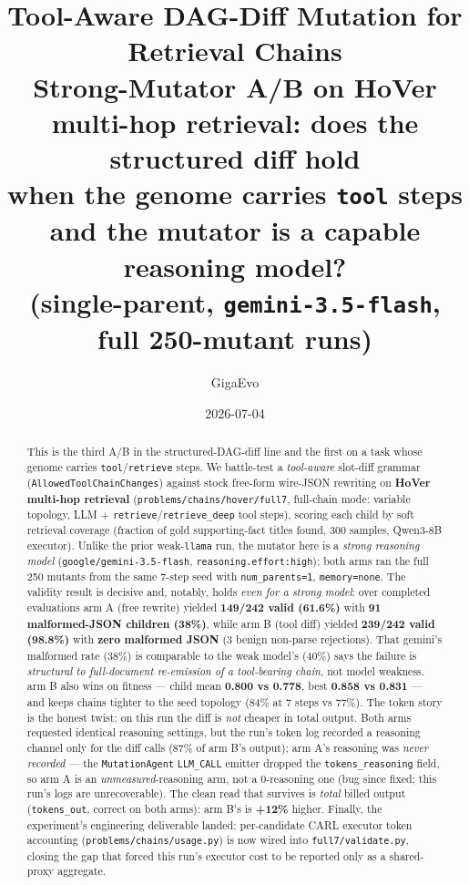 \documentclass[11pt]{article}
\title{\color{accent}\bfseries Tool-Aware DAG-Diff Mutation for Retrieval Chains\\
\large Strong-Mutator A/B on HoVer multi-hop retrieval: does the structured diff hold\\
when the genome carries \texttt{tool} steps and the mutator is a capable reasoning model?\\
\large (single-parent, \texttt{gemini-3.5-flash}, full 250-mutant runs)}
\author{GigaEvo}
\date{2026-07-04}
\newcommand{\armA}{\textcolor{bad}{arm A}}
\newcommand{\armB}{\textcolor{accent}{arm B}}
\begin{document}
\maketitle

\begin{abstract}
\noindent
This is the third A/B in the structured-DAG-diff line and the first on a task whose genome
carries \texttt{tool}/\texttt{retrieve} steps. We battle-test a \emph{tool-aware} slot-diff
grammar (\texttt{AllowedToolChainChanges}) against stock free-form wire-JSON rewriting on
\textbf{HoVer multi-hop retrieval} (\texttt{problems/chains/hover/full7}, full-chain mode:
variable topology, LLM + \texttt{retrieve}/\texttt{retrieve\_deep} tool steps), scoring each
child by soft retrieval coverage (fraction of gold supporting-fact titles found, 300 samples,
Qwen3-8B executor). Unlike the prior weak-\texttt{llama} run, the mutator here is a
\emph{strong reasoning model} (\texttt{google/gemini-3.5-flash}, \texttt{reasoning.effort:high});
both arms ran the full 250 mutants from the same 7-step seed with \texttt{num\_parents=1},
\texttt{memory=none}. The validity result is decisive and, notably, holds \emph{even for a
strong model}: over completed evaluations \armA{} (free rewrite) yielded \textbf{149/242 valid
(61.6\%)} with \textbf{91 malformed-JSON children (38\%)}, while \armB{} (tool diff) yielded
\textbf{239/242 valid (98.8\%)} with \textbf{zero malformed JSON} (3 benign non-parse
rejections). That gemini's malformed rate (38\%) is comparable to the weak model's (40\%) says
the failure is \emph{structural to full-document re-emission of a tool-bearing chain}, not
model weakness. \armB{} also wins on fitness --- child mean \textbf{0.800 vs 0.778}, best
\textbf{0.858 vs 0.831} --- and keeps chains tighter to the seed topology (84\% at 7 steps vs
77\%). The token story is the honest twist: on this run the diff is \emph{not} cheaper in total
output. Both arms requested identical reasoning settings, but the run's token log recorded a
reasoning channel only for the diff calls (87\% of \armB's output); \armA's reasoning was
\emph{never recorded} --- the \texttt{MutationAgent} \texttt{LLM\_CALL} emitter dropped the
\texttt{tokens\_reasoning} field, so \armA{} is an \emph{unmeasured}-reasoning arm, not a
0-reasoning one (bug since fixed; this run's logs are unrecoverable). The clean read that
survives is \emph{total} billed output (\texttt{tokens\_out}, correct on both arms): \armB's is
\textbf{+12\%} higher. Finally, the
experiment's engineering deliverable landed: per-candidate CARL executor token accounting
(\texttt{problems/chains/usage.py}) is now wired into \texttt{full7/validate.py}, closing the
gap that forced this run's executor cost to be reported only as a shared-proxy aggregate.
\end{abstract}
\end{document}
